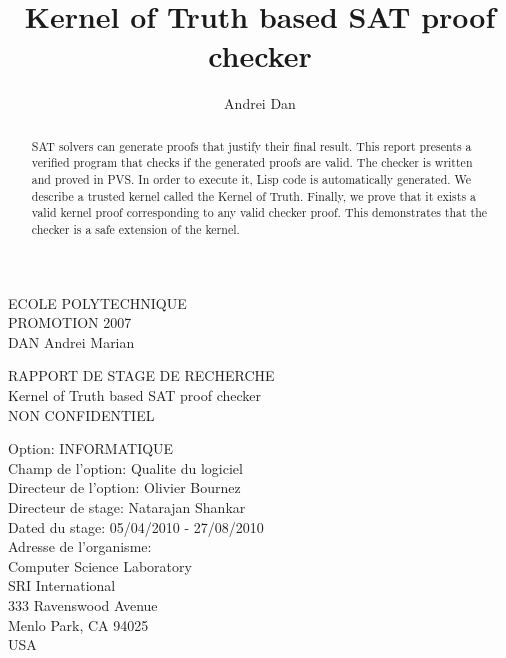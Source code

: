 \documentclass[a4paper,12pt]{article}
\title{Kernel of Truth based SAT proof checker}
\author{Andrei Dan}
\begin{document}
\noindent 
ECOLE POLYTECHNIQUE \\ 
PROMOTION 2007 \\ 
DAN Andrei Marian \\

\vspace{1in}

\begin{center}

 {\large RAPPORT DE STAGE DE RECHERCHE \\
\vspace{0.3in}
 {\LARGE Kernel of Truth based SAT proof checker} \\
\vspace{0.3in}
 NON CONFIDENTIEL}

\end{center}

\vspace{1in}
\noindent
Option: INFORMATIQUE
\\ Champ de l'option: Qualite du logiciel
\\ Directeur de l'option: Olivier Bournez
\\ Directeur de stage: Natarajan Shankar
\\ Dated du stage: 05/04/2010 - 27/08/2010
\\ Adresse de l'organisme: 
\\ Computer Science Laboratory
\\ SRI International
\\ 333 Ravenswood Avenue
\\ Menlo Park, CA 94025
\\ USA


\newpage
\verb| |
\vspace{2.2in}
\begin{abstract}
SAT solvers can generate proofs that justify their final result.
This report presents a verified program that checks if the generated proofs are valid. The checker is written and
proved in PVS. In order to execute it, Lisp code is automatically generated. 
We describe a trusted kernel called the Kernel of Truth. 
Finally, we prove that it exists a valid kernel proof corresponding to any valid checker proof. 
This demonstrates that the checker is a safe extension of the kernel.
\end{abstract}

\newpage
\verb| |
\vspace{0.8in}
\tableofcontents

\newpage
\end{document}
